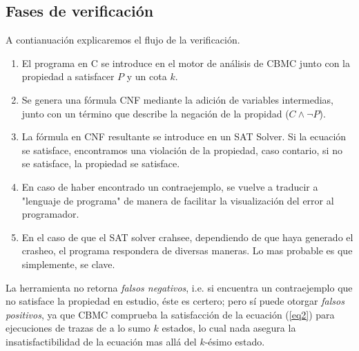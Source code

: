 \documentclass{llncs}
\begin{document}
        \subsection{Fases de verificación}
          A contianuación explicaremos el flujo de la verificación.
            \begin{enumerate}
                \item El programa en C se introduce en el motor de análisis
                    de CBMC junto con la propiedad a satisfacer $P$ y un cota
                    $k$. \\
                \item Se genera una fórmula CNF mediante la adición de
                    variables intermedias, junto con un término que describe la
                    negación de la propidad ($C \wedge \neg P$).\\
                \item La fórmula en  CNF resultante se introduce en un SAT
                    Solver. Si la ecuación se satisface, encontramos una
                    violación de la propiedad, caso contario, si no se
                    satisface, la propiedad se satisface.\\
                \item En caso de haber encontrado un contraejemplo, se
                    vuelve a traducir a "lenguaje de programa" de manera de
                    facilitar la visualización del error al programador.\\
                \item En el caso de que el SAT solver crahsee, dependiendo
                    de que haya generado el crasheo, el programa respondera de
                    diversas maneras. Lo mas probable es que simplemente, se
                    clave. %
            \end{enumerate}

         La herramienta no retorna \emph{falsos negativos}, i.e. si encuentra un
         contraejemplo que no satisface la propiedad en estudio, éste es
         certero; pero sí puede otorgar \emph{falsos positivos}, ya que CBMC
         comprueba la satisfacción de la ecuación (\ref{eq2}) para ejecuciones
         de trazas de a lo sumo $k$ estados, lo cual nada asegura la
         insatisfactibilidad de la ecuación mas allá del $k$-ésimo estado.
\end{document}
